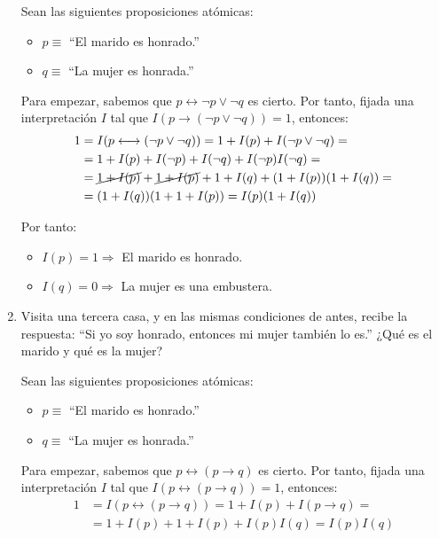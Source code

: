 \begin{ejercicio}
\begin{enumerate}
        Sean las siguientes proposiciones atómicas:
        \begin{itemize}
            \item $p\equiv$ ``El marido es honrado.''
            \item $q\equiv$ ``La mujer es honrada.''
        \end{itemize}

        Para empezar, sabemos que $p\longleftrightarrow \neg p\lor \neg q$ es cierto. Por tanto, fijada una interpretación $I$ tal que $I(p\longrightarrow (\neg p\lor \neg q))=1$, entonces:
        \begin{align*}
            1 &= I(p\longleftrightarrow (\neg p\lor \neg q))
            = 1+I(p) + I(\neg p\lor \neg q)
            =\\&= 1+I(p) + I(\neg p)+I(\neg q) + I(\neg p)I(\neg q)
            =\\&= \cancel{1+I(p)} + \cancel{1+I(p)} + 1+I(q) + (1+I(p))(1+I(q))
            =\\&= (1+I(q))(1+1+I(p)) = I(p)(1+I(q))
        \end{align*}

        Por tanto:
        \begin{itemize}
            \item $I(p) = 1\Longrightarrow$ El marido es honrado.
            \item $I(q) = 0\Longrightarrow$ La mujer es una embustera.
        \end{itemize}
        \item Visita una tercera casa, y en las mismas condiciones de antes, recibe la respuesta: ``Si yo soy honrado, entonces mi mujer también lo es.'' ¿Qué es el marido y qué es la mujer?
        
        Sean las siguientes proposiciones atómicas:
        \begin{itemize}
            \item $p\equiv$ ``El marido es honrado.''
            \item $q\equiv$ ``La mujer es honrada.''
        \end{itemize}

        Para empezar, sabemos que $p\longleftrightarrow (p\longrightarrow q)$ es cierto. Por tanto, fijada una interpretación $I$ tal que $I(p\longleftrightarrow (p\longrightarrow q))=1$, entonces:
        \begin{align*}
            1 &= I(p\longleftrightarrow (p\longrightarrow q))
            = 1+I(p) + I(p\longrightarrow q)
            =\\&= 1+I(p) + 1+I(p)+I(p)I(q)
            = I(p)I(q)
        \end{align*}


\end{enumerate}
\end{ejercicio}
